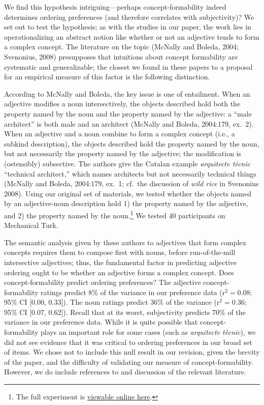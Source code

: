 \documentclass[12pt]{article}
\begin{document}
We find this hypothesis intriguing---perhaps concept-formability indeed determines ordering preferences (and therefore correlates with subjectivity)?
We set out to test the hypothesis; as with the studies in our paper, the work lies in operationalizing an abstract notion like whether or not an adjective tends to form a complex concept. The literature on the topic (McNally and Boleda, 2004; Svenonius, 2008) presupposes that intuitions about concept formability are systematic and generalizable; the closest we found in these papers to a proposal for an empirical measure of this factor is the following distinction.

According to McNally and Boleda, the key issue is one of entailment. When an adjective modifies a noun intersectively, the objects described hold both the property named by the noun and the property named by the adjective: a ``male architect'' is both male and an architect (McNally and Boleda, 2004:179, ex.~2). When an adjective and a noun combine to form a complex concept (i.e., a subkind description), the objects described hold the property named by the noun, but not necessarily the property named by the adjective; the modification is (ostensibly) subsective. The authors give the Catalan example \emph{arquitecte t\`{e}cnic} ``technical architect,'' which names architects but not necessarily technical things (McNally and Boleda, 2004:179, ex.~1; cf.~the discussion of \emph{wild rice} in Svenonius 2008). 
Using our original set of materials, we tested whether the objects named by an adjective-noun description hold 1) the property named by the adjective, and 2) the property named by the noun.\footnote{The full experiment is \href{http://web.stanford.edu/~scontras/adjective_ordering/experiments/9-concept-formability/concept-formability.html}{viewable online here}.} We tested 40 participants on Mechanical Turk. 


The semantic analysis given by these authors to adjectives that form complex concepts requires them to compose first with nouns, before run-of-the-mill intersective adjectives; thus, the fundamental factor in predicting adjective ordering ought to be whether an adjective forms a complex concept. Does concept-formability predict ordering preferences?
The adjective concept-formability ratings predict 8\% of the variance in our preference data (r$^{2}=0.08$; 95\% CI [0.00,  0.33]). The noun ratings predict 36\% of the variance (r$^{2}=0.36$; 95\% CI [0.07,  0.62]). Recall that at its worst, subjectivity predicts 70\% of the variance in our preference data.
While it is quite possible that concept-formability plays an important role for some cases (such as \emph{arquitecte t\`{e}cnic}), we did not see evidence that it was critical to ordering preferences in our broad set of items. We chose not to include this null result in our revision, given the brevity of the paper, and the difficulty of validating our measure of concept-formability. 
However, we do include references to and discussion of the relevant literature. 




 

\end{document}
